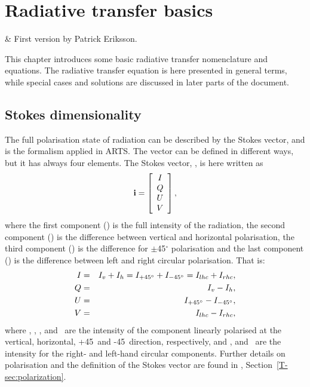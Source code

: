 \chapter{Radiative transfer basics}
 \label{sec:rte_basics}

 & First version by Patrick Eriksson.\\
\stophistory

This chapter introduces some basic radiative transfer nomenclature and
equations. The radiative transfer equation is here presented in general terms,
while special cases and solutions are discussed in later parts of the document.



\section{Stokes dimensionality}
\label{sec:fm_defs:polarisation}

The full polarisation state of radiation can be described by the Stokes vector,
and is the formalism applied in ARTS. The vector can be defined in different
ways, but it has always four elements. The Stokes vector, \StoVec, is here
written as
\begin{equation}
  \label{eq:fm_defs:stokevec}
  {\bf i} = \left[
  \begin{array}{c}
   I\\ Q \\ U\\ V
  \end{array}
  \right],
\end{equation}
where the first component (\StoI) is the full intensity of the
radiation, the second component (\StoQ) is the difference between
vertical and horizontal polarisation, the third component (\StoU) is the
difference for $\pm$45$^\circ$ polarisation and the last component
(\StoV) is the difference between left and right circular polarisation.
That is:
\begin{eqnarray}
  I &=&   I_v + I_h = I_{+45^\circ} + I_{-45^\circ} = I_{lhc} + I_{rhc}, \\
  Q &=&   I_v - I_h,                                 \\
  U &=&   I_{+45^\circ} - I_{-45^\circ},                             \\
  V &=&   I_{lhc} - I_{rhc},                             
\end{eqnarray}
where \Iv, \Ih, \Ipff, and \Imff\ are the intensity of the component linearly
polarised at the vertical, horizontal, +45\degree\ and -45\degree\ direction,
respectively, and \Irhc, and \Ilhc\ are the intensity for the right- and
left-hand circular components. Further details on polarisation and the
definition of the Stokes vector are found in \theory,
Section~\ref{T-sec:polarization}.

